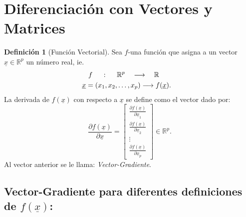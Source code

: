 \documentclass[
]{book}
\theoremstyle{definition}
\newtheorem{definition}{Definición}[chapter]
\theoremstyle{definition}
\theoremstyle{definition}
\theoremstyle{definition}
\theoremstyle{remark}
\begin{document}
\hypertarget{diferenc_vectores}{%
\section{Diferenciación con Vectores y Matrices}\label{diferenc_vectores}}

\begin{definition}[Función Vectorial]
\protect\hypertarget{def:funcion-vectorial}{}\label{def:funcion-vectorial}Sea \(f\)-una función que asigna a un vector \(\underline{x}\in \mathbb{R}^p\) un número real, ie.
\begin{align*}
f \ \ \ \ &: \ \ \ \ \mathbb{R}^p \ \ \ \longrightarrow \ \ \ \mathbb{R}\\
& \hspace{-1cm} \underline{x}=(x_1,x_2,\ldots,x_p) \longrightarrow f(\underline{x}).
\end{align*}
La derivada de \(f(\underline{x})\) con respecto a \(\underline{x}\) se define como el vector dado por:
\[
\frac{\partial f(\underline{x})}{\partial \underline{x}}=\begin{bmatrix}
\frac{\partial f(\underline{x})}{\partial \underline{x}_1} \\
\frac{\partial f(\underline{x})}{\partial \underline{x}_2}\\
\vdots \\
\frac{\partial f(\underline{x})}{\partial \underline{x}_p}
\end{bmatrix}\in \mathbb{R}^p.
\]
Al vector anterior se le llama: \emph{Vector-Gradiente}.
\end{definition}

\hypertarget{vector-gradiente-para-diferentes-definiciones-de-funderlinex}{%
\subsection{\texorpdfstring{Vector-Gradiente para diferentes definiciones de \(f(\underline{x})\):}{Vector-Gradiente para diferentes definiciones de f(\textbackslash underline\{x\}):}}\label{vector-gradiente-para-diferentes-definiciones-de-funderlinex}}
\end{document}

